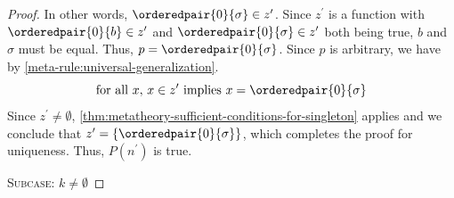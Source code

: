 \begin{proof}
    In other words, \( \orderedpair{0}{\sigma} \in z^{\prime} \).
    Since \( z^{\prime} \) is a function with \( \orderedpair{0}{b} \in z^{\prime} \) and \( \orderedpair{0}{\sigma} \in z^{\prime} \) both being true,
    \( b \) and \( \sigma \) must be equal.
    Thus, \( p = \orderedpair{0}{\sigma} \).
    Since \( p \) is arbitrary, we have by \cref{meta-rule:universal-generalization}.
    \begin{equation*}
        \text{for all \( x \), \( x \in z^{\prime} \) implies \( x = \orderedpair{0}{\sigma} \)}
    \end{equation*}
    Since \( z^{\prime} \neq \emptyset \), \cref{thm:metatheory-sufficient-conditions-for-singleton} applies and we conclude that
    \( z^{\prime} = \mleft\{ \orderedpair{0}{\sigma} \mright\} \), which completes the proof for uniqueness.
    Thus, \( P(n^{\prime}) \) is true.

    \vspace{0.3cm}
    \noindent
    {\scshape Subcase:} \( k \neq \emptyset \)


\end{proof}
